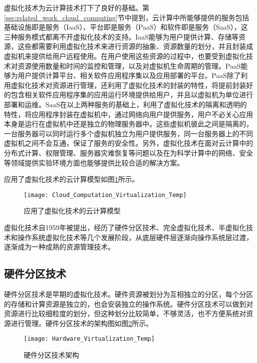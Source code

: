 虚拟化技术为云计算技术打下了良好的基础。第\ref{sec:related_work_cloud_computing}节中提到，云计算中所能够提供的服务包括基础设施即是服务（IaaS）、平台即是服务（PaaS）和软件即是服务（SaaS），这三种服务模式都离不开虚拟化技术的支持。IaaS能够为用户提供计算、存储等资源，这些都需要利用虚拟化技术来进行资源的抽象、资源数量的划分，并且封装成虚拟机来提供给用户远程使用。在用户使用这些资源的过程中，也要受到虚拟化技术对资源使用数量和时间的监控和管理，以及对虚拟机生命周期的管理。PaaS能够为用户提供计算平台、相关软件应用程序集以及应用部署的平台。PaaS除了利用虚拟化技术对资源进行管理，还利用了虚拟化技术的封装的特性，将提前封装好的包含相关软件应用程序集的应用运行环境提供给用户，并且以虚拟机为单位进行部署和运维。SaaS在以上两种服务的基础上，利用了虚拟化技术的隔离和透明的特性，将应用程序封装在虚拟机中，通过网络向用户提供服务，用户不必关心应用本身是运行在虚拟机中还是独立的物理服务器中。这些虚拟机彼此之间是隔离的，一台服务器可以同时运行多个虚拟机独立为用户提供服务，同一台服务器上的不同虚拟机之间不会互通，保证了服务的安全性。另外，虚拟化技术在面对云计算中的分布式计算、权限管理、服务器灾难恢复等问题以及在为科学计算中的网络、安全等领域提供实验环境方面也能够提供比较合适的解决方案\cite{2008半虚拟化技术分析与研究}。

应用了虚拟化技术的云计算模型如图\ref{fig:cloud_computation_virtualization}所示\citep{陈思锦2015云计算中的虚拟化技术与虚拟化安全}。
\begin{figure}[!htbp]
    \centering
    \texttt{[image: Cloud\_Computation\_Virtualization\_Temp]}
    \caption{应用了虚拟化技术的云计算模型}
    \label{fig:cloud_computation_virtualization}
\end{figure}

虚拟化技术自1959年被提出，经历了硬件分区技术、完全虚拟化技术、半虚拟化技术和操作系统虚拟化技术等几个发展阶段\cite{肖伟民2019嵌入式虚拟化}，从底层硬件层逐渐向操作系统层过渡，逐渐成为一种成熟的资源管理技术。

\subsection{硬件分区技术}

硬件分区技术是早期的虚拟化技术。硬件资源被划分为互相独立的分区，每个分区的存储和计算资源是独立的，也会安装独立的操作系统\cite{plessl2004virtualization}。硬件分区技术可以做到对资源进行比较细粒度的划分，但这种划分比较简单，不够灵活，也不方便系统对资源进行管理。硬件分区技术的架构图如图\ref{fig:hardware_virtualization}所示\cite{肖伟民2019嵌入式虚拟化}。

\begin{figure}[!htbp]
    \centering
    \texttt{[image: Hardware\_Virtualization\_Temp]}
    \caption{硬件分区技术架构}
    \label{fig:hardware_virtualization}
\end{figure}

